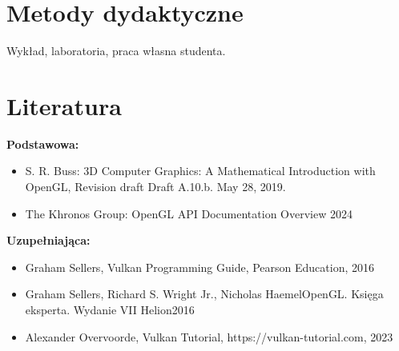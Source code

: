 \documentclass[12pt, a4paper]{article}
\begin{document}
\section{Metody dydaktyczne}

Wykład, laboratoria, praca własna studenta.

\section{Literatura}

\textbf{Podstawowa:}
\begin{itemize}
  \item S. R. Buss: 3D Computer Graphics: A Mathematical Introduction with OpenGL, Revision draft Draft A.10.b. May 28, 2019.
  \item The Khronos Group: OpenGL API Documentation Overview 2024
\end{itemize}

\textbf{Uzupełniająca:}
\begin{itemize}
  \item Graham Sellers, Vulkan Programming Guide, Pearson Education, 2016
  \item Graham Sellers, Richard S. Wright Jr., Nicholas HaemelOpenGL. Księga eksperta. Wydanie VII Helion2016
  \item Alexander Overvoorde, Vulkan Tutorial, https://vulkan-tutorial.com, 2023
\end{itemize}
\end{document}
